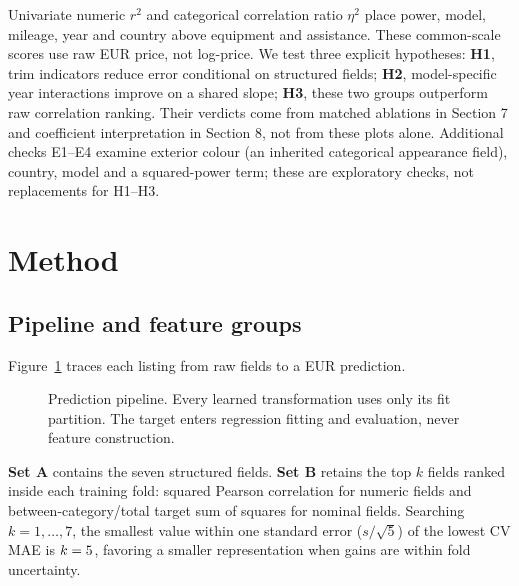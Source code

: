 Univariate numeric $r^2$ and categorical correlation ratio $\eta^2$ place power, model, mileage, year and country above equipment and assistance. These common-scale scores use raw EUR price, not log-price. We test three explicit hypotheses: \textbf{H1}, trim indicators reduce error conditional on structured fields; \textbf{H2}, model-specific year interactions improve on a shared slope; \textbf{H3}, these two groups outperform raw correlation ranking. Their verdicts come from matched ablations in Section 7 and coefficient interpretation in Section 8, not from these plots alone. Additional checks E1--E4 examine exterior colour (an inherited categorical appearance field), country, model and a squared-power term; these are exploratory checks, not replacements for H1--H3.

\section{Method}
\subsection{Pipeline and feature groups}
Figure~\ref{fig:pipeline} traces each listing from raw fields to a EUR prediction.
\begin{figure}[h]
\centering
{}
\caption{Prediction pipeline. Every learned transformation uses only its fit partition. The target enters regression fitting and evaluation, never feature construction.}
\label{fig:pipeline}
\end{figure}
\textbf{Set A} contains the seven structured fields. \textbf{Set B} retains the top $k$ fields ranked inside each training fold: squared Pearson correlation for numeric fields and between-category/total target sum of squares for nominal fields. Searching $k=1,\ldots,7$, the smallest value within one standard error ($s/\sqrt{5}$) of the lowest CV MAE is $k=5{}$, favoring a smaller representation when gains are within fold uncertainty.

